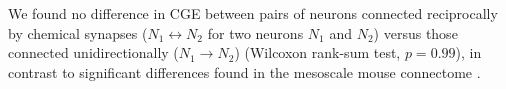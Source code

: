 \documentclass[10pt,letterpaper]{article}
\begin{document}
We found no difference in CGE between pairs of neurons connected reciprocally by chemical synapses ($N_1 \leftrightarrow N_2$ for two neurons $N_1$ and $N_2$) versus those connected unidirectionally ($N_1 \rightarrow N_2$) (Wilcoxon rank-sum test, $p = 0.99$), in contrast to significant differences found in the mesoscale mouse connectome \cite{Fulcher:2016ck}.
\end{document}
